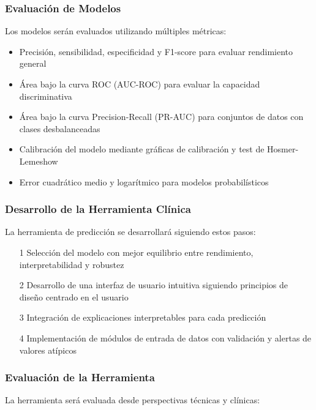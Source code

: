 \documentclass{article}
\begin{document}
\subsubsection{Evaluación de Modelos}
Los modelos serán evaluados utilizando múltiples métricas:

\begin{itemize}
\item Precisión, sensibilidad, especificidad y F1-score para
    evaluar rendimiento general\cite{powers2011evaluation}
\item Área bajo la curva ROC (AUC-ROC) para evaluar la
    capacidad discriminativa \cite{Fawcett2006}
\item Área bajo la curva Precision-Recall (PR-AUC) para
    conjuntos de datos con clases desbalanceadas
    \cite{davis2006relationship}
\item Calibración del modelo mediante gráficas de
    calibración y test de Hosmer-Lemeshow
    \cite{alba2017discrimination}
\item Error cuadrático medio y logarítmico para modelos
    probabilísticos \cite{brier1950verification}
\end{itemize}


\subsubsection{Desarrollo de la Herramienta Clínica}
La herramienta de predicción se desarrollará siguiendo estos pasos:

\begin{itemize}
    \item[1] Selección del modelo con mejor equilibrio entre
        rendimiento, interpretabilidad y robustez
        \cite{sendak2020path}
    \item[2] Desarrollo de una interfaz de usuario intuitiva
        siguiendo principios de diseño centrado en el
        usuario \cite{johnson2005designing}
    \item[3] Integración de explicaciones interpretables
        para cada predicción \cite{caruana2015intelligible}
    \item[4] Implementación de módulos de entrada de datos
        con validación y alertas de valores atípicos
        \cite{sutton2020overview}
\end{itemize}

\subsubsection{Evaluación de la Herramienta}
La herramienta será evaluada desde perspectivas técnicas y clínicas:
\end{document}
